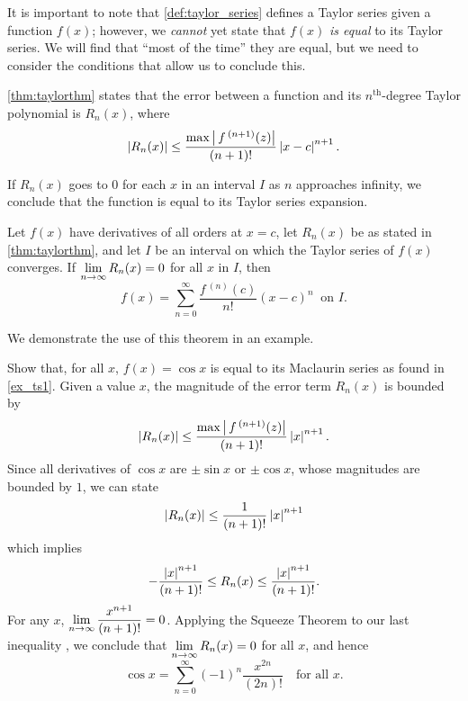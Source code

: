 It is important to note that \autoref{def:taylor_series} defines a Taylor series given a function $f(x)$; however, we \emph{cannot} yet state that $f(x)$ \emph{is equal} to its Taylor series. We will find that ``most of the time'' they are equal, but we need to consider the conditions that allow us to conclude this.

\autoref{thm:taylorthm} states that the error between a function and its $n^{\text{th}}$-degree Taylor polynomial is $R_n(x)$, where
\[\left\lvert R_n(x) \right\rvert\leq \frac{\max\left\lvert \,f\,^{(n+1)}(z) \right\rvert}{(n+1)!}\left\lvert x-c \right\rvert^{n+1}.\]

If $R_n(x)$ goes to 0 for each $x$ in an interval $I$ as $n$ approaches infinity, we conclude that the function is equal to its Taylor series expansion.

\begin{theorem}\label{thm:function_series_equality}%
Let $f(x)$ have derivatives of all orders at $x=c$, let $R_n(x)$ be as stated in \autoref{thm:taylorthm}, and let $I$ be an interval on which the Taylor series of $f(x)$ converges. 
If $\displaystyle\lim_{n\to\infty} R_n(x) = 0$ for all $x$ in $I$, then 
\[f(x) = \sum_{n=0}^\infty \frac{f\,^{(n)}(c)}{n!}(x-c)^n\ \text{ on $I$.}\]
\end{theorem}

We demonstrate the use of this theorem in an example.

\begin{example}\label{ex_ts3}%
Show that, for all $x$, $f(x) = \cos x$ is equal to its Maclaurin series as found in \autoref{ex_ts1}.
\solution
Given a value $x$, the magnitude of the error term $R_n(x)$ is bounded by
\[\left\lvert R_n(x) \right\rvert\leq \frac{\max\left\lvert \,f\,^{(n+1)}(z) \right\rvert}{(n+1)!}\left\lvert x \right\rvert^{n+1}.\]
Since all derivatives of $\cos x$ are $\pm \sin x$ or $\pm\cos x$, whose magnitudes are bounded by $1$, we can state
\[\left\lvert R_n(x) \right\rvert\leq \frac{1}{(n+1)!}\left\lvert x \right\rvert^{n+1}\]
which implies
\begin{equation*}
 -\frac{\abs{x}^{n+1}}{(n+1)!} \leq R_n(x) \leq\frac{\abs{x}^{n+1}}{(n+1)!}.%
\end{equation*}
For any $x$, $\displaystyle\lim_{n\to\infty} \frac{x^{n+1}}{(n+1)!} = 0$. Applying the Squeeze Theorem to our last inequality%
, we conclude that $\displaystyle \lim_{n\to\infty} R_n(x) = 0$ for all $x$, and hence
\[\cos x = \sum_{n=0}^\infty (-1)^{n}\frac{x^{2n}}{(2n)!}\quad \text{for all $x$}.\]
\end{example}

